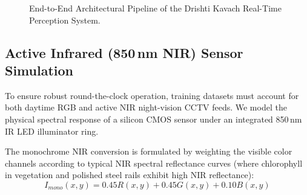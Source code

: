 \documentclass[conference]{IEEEtran}
\begin{document}
\begin{figure}[t]
\centering
{}
\caption{End-to-End Architectural Pipeline of the Drishti Kavach Real-Time Perception System.}
\label{fig:architecture}
\end{figure}

\subsection{Active Infrared (850\,nm NIR) Sensor Simulation}
To ensure robust round-the-clock operation, training datasets must account for both daytime RGB and active NIR night-vision CCTV feeds. We model the physical spectral response of a silicon CMOS sensor under an integrated 850\,nm IR LED illuminator ring.

The monochrome NIR conversion is formulated by weighting the visible color channels according to typical NIR spectral reflectance curves (where chlorophyll in vegetation and polished steel rails exhibit high NIR reflectance):
\begin{equation}
I_{mono}(x, y) = 0.45 R(x,y) + 0.45 G(x,y) + 0.10 B(x,y)
\end{equation}
\end{document}
